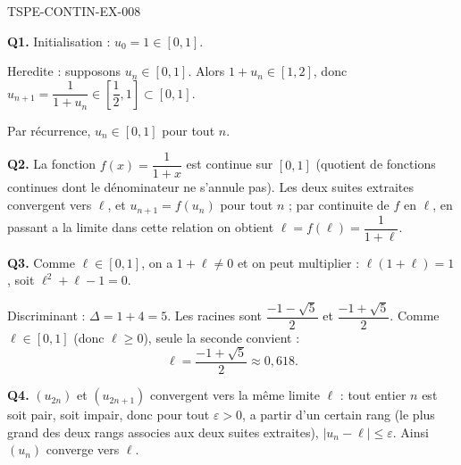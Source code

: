 \begin{corrige}{TSPE-CONTIN-EX-008}

\textbf{Q1.} Initialisation : $u_0 = 1 \in [0,1]$.

Heredite : supposons $u_n \in [0,1]$. Alors $1 + u_n \in [1,2]$, donc $u_{n+1} = \dfrac{1}{1+u_n} \in \left[\dfrac{1}{2}, 1\right] \subset [0,1]$.

Par récurrence, $u_n \in [0,1]$ pour tout $n$.

\textbf{Q2.} La fonction $f(x) = \dfrac{1}{1+x}$ est continue sur $[0,1]$ (quotient de fonctions continues dont le dénominateur ne s'annule pas). Les deux suites extraites convergent vers $\ell$, et $u_{n+1} = f(u_n)$ pour tout $n$ ; par continuite de $f$ en $\ell$, en passant a la limite dans cette relation on obtient $\ell = f(\ell) = \dfrac{1}{1+\ell}$.

\textbf{Q3.} Comme $\ell \in [0,1]$, on a $1+\ell
\neq 0$ et on peut multiplier : $\ell(1+\ell) = 1$, soit $\ell^2 + \ell - 1 = 0$.

Discriminant : $\Delta = 1 + 4 = 5$. Les racines sont $\dfrac{-1-\sqrt{5}}{2}$ et $\dfrac{-1+\sqrt{5}}{2}$. Comme $\ell \in [0,1]$ (donc $\ell \geq 0$), seule la seconde convient :
\[
\boxed{\ell = \frac{-1+\sqrt{5}}{2}} \approx 0{,}618.
\]

\textbf{Q4.} $(u_{2n})$ et $(u_{2n+1})$ convergent vers la même limite $\ell$ : tout entier $n$ est soit pair, soit impair, donc pour tout $\varepsilon > 0$, a partir d'un certain rang (le plus grand des deux rangs associes aux deux suites extraites), $|u_n - \ell| \leq \varepsilon$. Ainsi $(u_n)$ converge vers $\ell$.

\end{corrige}
